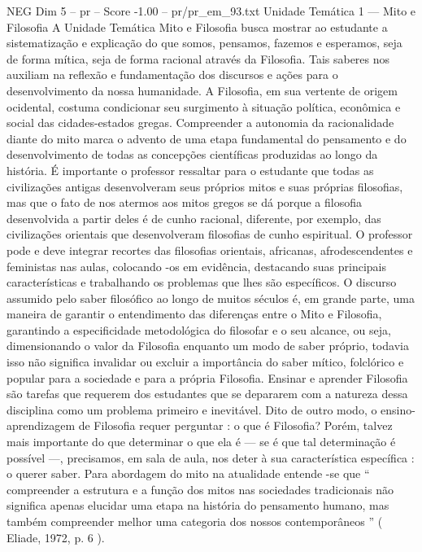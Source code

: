 \begin{textsample}{NEG Dim 5 – pr – Score -1.00 – pr/pr\_em\_93.txt}  \label{ex:f5_neg_232}
Unidade Temática 1 — Mito e Filosofia A Unidade Temática Mito e Filosofia busca mostrar ao estudante a sistematização e explicação do que somos, pensamos, fazemos e esperamos, seja de forma mítica, seja de forma racional através da Filosofia.
Tais saberes nos auxiliam na reflexão e fundamentação dos discursos e ações para o desenvolvimento da nossa humanidade.
A Filosofia, em sua vertente de origem ocidental, costuma condicionar seu surgimento à situação política, econômica e social das cidades-estados gregas.
Compreender a autonomia da racionalidade diante do mito marca o advento de uma etapa fundamental do pensamento e do desenvolvimento de todas as concepções científicas produzidas ao longo da história.
É importante o professor ressaltar para o estudante que todas as civilizações antigas desenvolveram seus próprios mitos e suas próprias filosofias, mas que o fato de nos atermos aos mitos gregos se dá porque a filosofia desenvolvida a partir deles é de cunho racional, diferente, por exemplo, das civilizações orientais que desenvolveram filosofias de cunho espiritual.
O professor pode e deve integrar recortes das filosofias orientais, africanas, afrodescendentes e feministas nas aulas, colocando -os em evidência, destacando suas principais características e trabalhando os problemas que lhes são específicos.
O discurso assumido pelo saber filosófico ao longo de muitos séculos é, em grande parte, uma maneira de garantir o entendimento das diferenças entre o Mito e Filosofia, garantindo a especificidade metodológica do filosofar e o seu alcance, ou seja, dimensionando o valor da Filosofia enquanto um modo de saber próprio, todavia isso não significa invalidar ou excluir a importância do saber mítico, folclórico e popular para a sociedade e para a própria Filosofia.
Ensinar e aprender Filosofia são tarefas que requerem dos estudantes que se depararem com a natureza dessa disciplina como um problema primeiro e inevitável.
Dito de outro modo, o ensino-aprendizagem de Filosofia requer perguntar : o que é Filosofia?
Porém, talvez mais importante do que determinar o que ela é — se é que tal determinação é possível —, precisamos, em sala de aula, nos deter à sua característica específica : o querer saber.
Para abordagem do mito na atualidade entende -se que “ compreender a estrutura e a função dos mitos nas sociedades tradicionais não significa apenas elucidar uma etapa na história do pensamento humano, mas também compreender melhor uma categoria dos nossos contemporâneos ” ( Eliade, 1972, p. 6 ).

\end{textsample}

